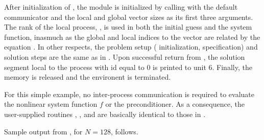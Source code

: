 After initialization of {\mpi}, the {\nvecp} module is initialized by calling
 with the default {\mpi} communicator  and
the local and global vector sizes as its first three arguments.
The rank of the local process, , is used in both the initial guess
and the system function, inasmuch as the global and local indices to
the vector  are related by the equation .
In other respects, the problem setup ({\kinsol} initialization, {\kinspgmr} specification)
and solution steps are the same as in . 
Upon successful return from , the solution segment local to 
the process with id equal to $0$ is printed to unit 6.
Finally, the {\kinsol} memory is released and the {\mpi} environent is
terminated. 

For this simple example, no inter-process communication is required to
evaluate the nonlinear system function $f$ or the preconditioner. 
As a consequence, the user-supplied routines , , and
 are basically identical to those in .

Sample output from , for $N=128$, follows.

